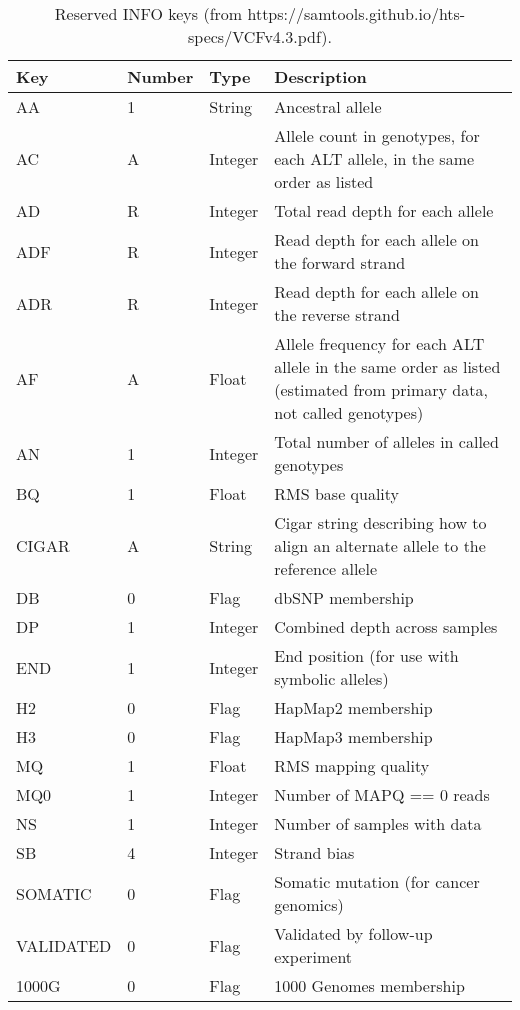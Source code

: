 \begin{table}[H]
    \centering
    \begin{tabularx}{\textwidth}{ | p{2.5cm} | p{1.5cm} | p{1.5cm} | X | }
    \toprule
    Key		& Number	& Type		& Description \\ 
    \midrule
	AA		& 1		& String	& Ancestral allele \\
	AC		& A		& Integer	& Allele count in genotypes, for each ALT allele, in the same order as listed  \\
	AD		& R		& Integer	& Total read depth for each allele \\
	ADF		& R		& Integer	& Read depth for each allele on the forward strand \\
	ADR		& R		& Integer	& Read depth for each allele on the reverse strand \\
	AF		& A		& Float		& Allele frequency for each ALT allele in the same order as listed (estimated from primary data, not called genotypes) \\
	AN		& 1		& Integer	& Total number of alleles in called genotypes \\
	BQ   		& 1		& Float		& RMS base quality \\
	CIGAR		& A		& String	& Cigar string describing how to align an alternate allele to the reference allele \\
	DB		& 0		& Flag		& dbSNP membership \\
	DP		& 1		& Integer	& Combined depth across samples \\
	END		& 1		& Integer	& End position (for use with symbolic alleles) \\
	H2		& 0		& Flag		& HapMap2 membership \\
	H3		& 0		& Flag		& HapMap3 membership \\
	MQ		& 1		& Float		& RMS mapping quality \\
	MQ0   		& 1		& Integer	& Number of MAPQ == 0 reads \\
	NS		& 1		& Integer	& Number of samples with data \\
	SB		& 4		& Integer	& Strand bias \\
	SOMATIC		& 0		& Flag		& Somatic mutation (for cancer genomics) \\
	VALIDATED	& 0		& Flag		& Validated by follow-up experiment \\
    1000G		& 0		& Flag		& 1000 Genomes membership \\
    \bottomrule
    \end{tabularx}
    \caption{Reserved INFO keys (from https://samtools.github.io/hts-specs/VCFv4.3.pdf).}
    \label{tab:reserved-info}
  \end{table}

